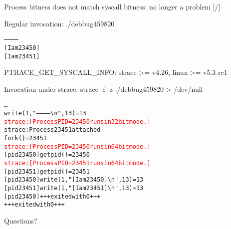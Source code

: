\documentclass[unicode,aspectratio=169]{beamer}
\begin{document}
\begin{frame}[fragile]{Process bitness does not match syscall bitness: no longer a problem \hfill [\insertframenumber/\inserttotalframenumber]}
\large
{}

\begin{block}{Regular invocation: ./debbug459820}
\begin{alltt}
------------
[I am 23450]
[I am 23451]
\end{alltt}
\end{block}
\end{frame}

\begin{frame}[fragile]{PTRACE\_GET\_SYSCALL\_INFO: strace >= v4.26, linux >= v5.3-rc1}
\large
\begin{block}{Invocation under strace: strace -f -z ./debbug459820 > /dev/null}
\begin{alltt}
\ldots
write(1, "------------{\textbackslash}n", 13)          = 13
\textcolor{red}{strace: [ Process PID=23450 runs in 32 bit mode. ]}
strace: Process 23451 attached
fork()                                  = 23451
\textcolor{red}{strace: [ Process PID=23450 runs in 64 bit mode. ]}
[pid 23450] getpid()                    = 23450
\textcolor{red}{strace: [ Process PID=23451 runs in 64 bit mode. ]}
[pid 23451] getpid()                    = 23451
[pid 23450] write(1, "[I am 23450]{\textbackslash}n", 13) = 13
[pid 23451] write(1, "[I am 23451]{\textbackslash}n", 13) = 13
[pid 23450] +++ exited with 0 +++
+++ exited with 0 +++
\end{alltt}
\end{block}
\end{frame}

{
\begin{frame}{Questions?}
	\begin{columns}
		\column{4cm}
			\centerline{}
		\column{3cm}
		\column{3cm}
			\centerline{}
	\end{columns}
\end{frame}
}
\end{document}
